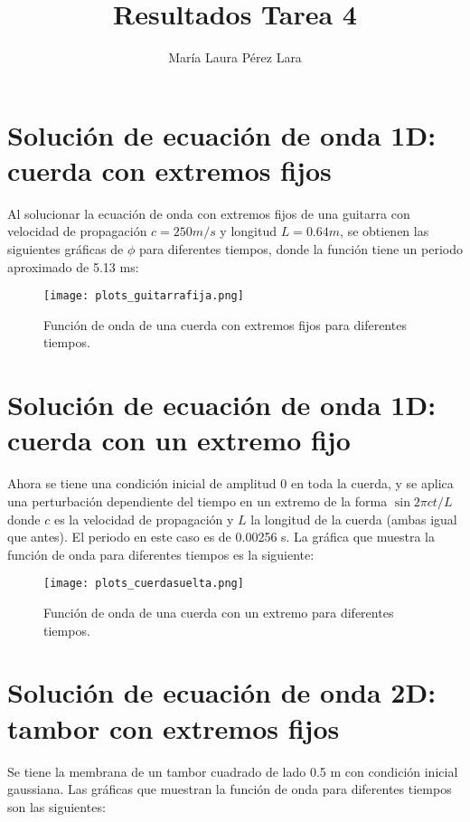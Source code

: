 \documentclass[a4paper,10pt]{article}
\begin{document}
\title{Resultados Tarea 4}

\author{María Laura Pérez Lara}

\maketitle
\section{Solución de ecuación de onda 1D: cuerda con extremos fijos}

Al solucionar la ecuación de onda con extremos fijos de una guitarra con velocidad de propagación $c=250 m/s$ y longitud $L=0.64m$, se obtienen las siguientes gráficas de $\phi$ para diferentes tiempos, donde la función tiene un periodo aproximado de 5.13 ms:

\begin{figure}[H]
    \centering
    \texttt{[image: plots\_guitarrafija.png]}
    \caption{Función de onda de una cuerda con extremos fijos para diferentes tiempos.}
\end{figure}

\section{Solución de ecuación de onda 1D: cuerda con un extremo fijo}

Ahora se tiene una condición inicial de amplitud 0 en toda la cuerda, y se aplica una perturbación dependiente del tiempo en un extremo de la forma $\sin{2\pi ct/L}$ donde $c$ es la velocidad de propagación y $L$ la longitud de la cuerda (ambas igual que antes). El periodo en este caso es de 0.00256 s. La gráfica que muestra la función de onda para diferentes tiempos es la siguiente:

\begin{figure}[H]
    \centering
    \texttt{[image: plots\_cuerdasuelta.png]}
    \caption{Función de onda de una cuerda con un extremo para diferentes tiempos.}
\end{figure}

\section{Solución de ecuación de onda 2D: tambor con extremos fijos}

Se tiene la membrana de un tambor cuadrado de lado 0.5 m con condición inicial gaussiana. Las gráficas que muestran la función de onda para diferentes tiempos son las siguientes:
\end{document}
